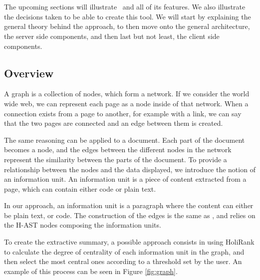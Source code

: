 \section{\projectName}\label{sec:projectDesign}
The upcoming sections will illustrate \projectName~and all of its features. We also illustrate the decisions taken to be able to create this tool. We will start by explaining the general theory behind the approach, to then move onto the general architecture, the server side components, and then last but not least, the client side components. 

\subsection{Overview}

A graph is a collection of nodes, which form a network. If we consider the world wide web, we can represent each page as a node inside of that network. When a connection exists from a page to another, for example with a link, we can say that the two pages are connected and an edge between them is created. 

The same reasoning can be applied to a document. Each part of the document becomes a node, and the edges between the different nodes in the network represent the similarity between the parts of the document. To provide a relationship between the nodes and the data displayed, we introduce the notion of an information unit. An information unit is a piece of content extracted from a page, which can contain either code or plain text.

In our approach, an information unit is a paragraph where the content can either be plain text, or code. The construction of the edges is the same as \cite{Ponz2015b}, and relies on the H-AST nodes composing the information units.  

To create the extractive summary, a possible approach consists in using HoliRank to calculate the degree of centrality of each information unit in the graph, and then select the most central ones according to a threshold set by the user. An example of this process can be seen in Figure \ref{fig:graph}.

